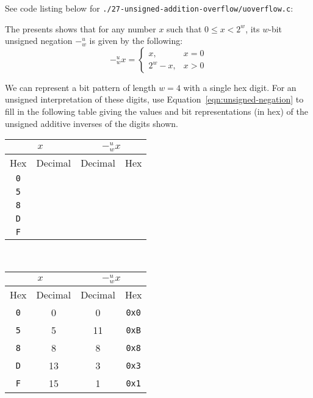 \documentclass[12pt]{article}
\newenvironment{ex}[2][Exercise]{\begin{trivlist}
		\item[\hskip \labelsep {\bfseries #1}\hskip \labelsep {\bfseries #2.}]}{\end{trivlist}}
\newenvironment{sol}[1][Solution]{\begin{trivlist}
		\item[\hskip \labelsep {\bfseries #1:}]}{\end{trivlist}}
\begin{document}
\begin{sol}
	See code listing below for \texttt{./27-unsigned-addition-overflow/uoverflow.c}:
	
\end{sol}

\begin{ex}{2.28}
	The presents shows that for any number $x$ such that $0\leq x<2^w$, its $w$-bit
	unsigned negation $-^u_w$ is given by the following:
	\begin{equation}\label{eqn:unsigned-negation}
		-^u_wx=\begin{cases}
			x, & x = 0\\
			2^w-x, & x > 0
		\end{cases}
	\end{equation}

	\noindent We can represent a bit pattern of length $w=4$ with a single hex digit. For an
	unsigned interpretation of these digits, use Equation~\ref{eqn:unsigned-negation}
	to fill in the following table giving the values and bit representations (in hex)
	of the unsigned additive inverses of the digits shown.
	\begin{center}
		\begin{tabular}{cccc}
			\multicolumn{2}{c}{$x$} & \multicolumn{2}{c}{$-^u_wx$}\\
			\hline
			Hex & Decimal & Decimal & Hex\\
			\hline
			\texttt{0} & \makebox[1cm]{\hrulefill} & \makebox[1cm]{\hrulefill} & \makebox[1cm]{\hrulefill}\\
			\texttt{5} & \makebox[1cm]{\hrulefill} & \makebox[1cm]{\hrulefill} & \makebox[1cm]{\hrulefill}\\
			\texttt{8} & \makebox[1cm]{\hrulefill} & \makebox[1cm]{\hrulefill} & \makebox[1cm]{\hrulefill}\\
			\texttt{D} & \makebox[1cm]{\hrulefill} & \makebox[1cm]{\hrulefill} & \makebox[1cm]{\hrulefill}\\
			\texttt{F} & \makebox[1cm]{\hrulefill} & \makebox[1cm]{\hrulefill} & \makebox[1cm]{\hrulefill}
		\end{tabular}
	\end{center}
\end{ex}

\begin{sol}
	\
	\begin{center}
		\begin{tabular}{cccc}
			\multicolumn{2}{c}{$x$} & \multicolumn{2}{c}{$-^u_wx$}\\
			\hline
			Hex & Decimal & Decimal & Hex\\
			\hline
			\texttt{0} & 0 & 0 & \texttt{0x0}\\
			\texttt{5} & 5 & 11 & \texttt{0xB}\\
			\texttt{8} & 8 & 8 & \texttt{0x8}\\
			\texttt{D} & 13 & 3 & \texttt{0x3}\\
			\texttt{F} & 15 & 1 & \texttt{0x1}
		\end{tabular}
	\end{center}
\end{sol}
\end{document}
